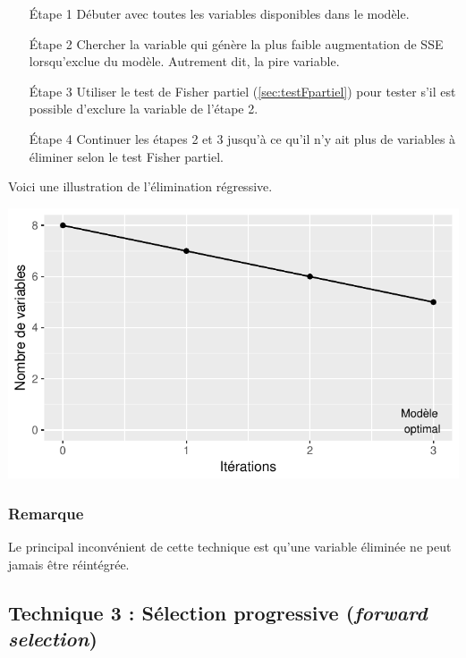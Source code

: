 \documentclass[11pt,french]{report}
\begin{document}
\begin{itemize}
\item [Étape 1] Débuter avec toutes les variables disponibles dans le modèle.

\item [Étape 2] Chercher la variable qui génère la plus faible augmentation de SSE lorsqu'exclue du modèle. Autrement dit, la pire variable.

\item [Étape 3] Utiliser le test de Fisher partiel (\ref{sec:testFpartiel}) pour tester s'il est possible d'exclure la variable de l'étape 2.

\item [Étape 4] Continuer les étapes 2 et 3 jusqu'à ce qu'il n'y ait plus de variables à éliminer selon le test Fisher partiel.
\end{itemize}
\bigskip

Voici une illustration de l'élimination régressive.

\includegraphics{notes_de_cours-026}

\subsubsection*{Remarque}
Le principal inconvénient de cette technique est qu'une variable éliminée ne peut jamais être réintégrée. 

\subsection{Technique 3 : Sélection progressive (\emph{forward selection})}
\label{tech3}
\end{document}
